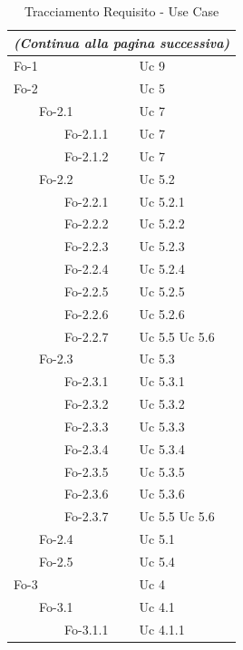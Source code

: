 \documentclass[10pt,a4paper]{article}
\begin{document}
\begin{longtable}{|p{5cm}|p{5cm}|}
\caption{Tracciamento Requisito - Use Case}\\
\hline
\endfirsthead
\multicolumn{2}{r}{\textit{(Continua alla pagina successiva)}}
\endfoot
\multicolumn{2}{l}{\textit{(Continua dalla pagina precedente)}}
\endhead
\hline
\endlastfoot
\textbf{Codice Requisito}& \textbf{Codice Use Case}\\
\hline
Fo-1 & Uc 9\\
\hline
Fo-2 & Uc 5\\
\hline
\ \ \ \ Fo-2.1 & Uc 7\\
\hline
\ \ \ \ \ \ \ \ Fo-2.1.1 & Uc 7\\
\hline
\ \ \ \ \ \ \ \ Fo-2.1.2 & Uc 7\\
\hline
\ \ \ \ Fo-2.2 & Uc 5.2\\
\hline
\ \ \ \ \ \ \ \ Fo-2.2.1 & Uc 5.2.1\\
\hline
\ \ \ \ \ \ \ \ Fo-2.2.2 & Uc 5.2.2\\
\hline
\ \ \ \ \ \ \ \ Fo-2.2.3 & Uc 5.2.3\\
\hline
\ \ \ \ \ \ \ \ Fo-2.2.4 & Uc 5.2.4\\
\hline
\ \ \ \ \ \ \ \ Fo-2.2.5 & Uc 5.2.5\\
\hline
\ \ \ \ \ \ \ \ Fo-2.2.6 & Uc 5.2.6\\
\hline
\ \ \ \ \ \ \ \ Fo-2.2.7 & Uc 5.5 \newline Uc 5.6\\
\hline
\ \ \ \ Fo-2.3 & Uc 5.3\\
\hline
\ \ \ \ \ \ \ \ Fo-2.3.1 & Uc 5.3.1\\
\hline
\ \ \ \ \ \ \ \ Fo-2.3.2 & Uc 5.3.2\\
\hline
\ \ \ \ \ \ \ \ Fo-2.3.3 & Uc 5.3.3\\
\hline
\ \ \ \ \ \ \ \ Fo-2.3.4 & Uc 5.3.4\\
\hline
\ \ \ \ \ \ \ \ Fo-2.3.5 & Uc 5.3.5\\
\hline
\ \ \ \ \ \ \ \ Fo-2.3.6 & Uc 5.3.6\\
\hline
\ \ \ \ \ \ \ \ Fo-2.3.7 & Uc 5.5 \newline Uc 5.6\\
\hline
\ \ \ \ Fo-2.4 & Uc 5.1\\
\hline
\ \ \ \ Fo-2.5 & Uc 5.4\\
\hline
Fo-3 & Uc 4\\
\hline
\ \ \ \ Fo-3.1 & Uc 4.1\\
\hline
\ \ \ \ \ \ \ \ Fo-3.1.1 & Uc 4.1.1\\

\end{longtable}
\end{document}
